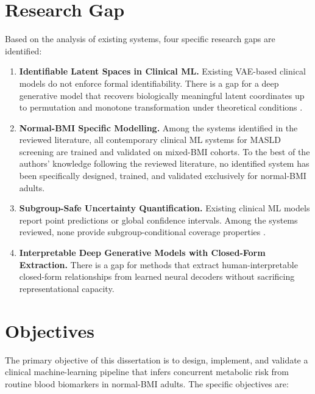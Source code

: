 \documentclass[12pt,a4paper,oneside]{report}
\begin{document}
\section{Research Gap}

Based on the analysis of existing systems, four specific research gaps are identified:

\begin{enumerate}[leftmargin=*]
    \item \textbf{Identifiable Latent Spaces in Clinical ML.} Existing VAE-based clinical models do not enforce formal identifiability. There is a gap for a deep generative model that recovers biologically meaningful latent coordinates up to permutation and monotone transformation under theoretical conditions \citep{khemakhem2020,kingma2014}.

    \item \textbf{Normal-BMI Specific Modelling.} Among the systems identified in the reviewed literature, all contemporary clinical ML systems for MASLD screening are trained and validated on mixed-BMI cohorts. To the best of the authors' knowledge following the reviewed literature, no identified system has been specifically designed, trained, and validated exclusively for normal-BMI adults.

    \item \textbf{Subgroup-Safe Uncertainty Quantification.} Existing clinical ML models report point predictions or global confidence intervals. Among the systems reviewed, none provide subgroup-conditional coverage properties \citep{barber2023,vovk2005}.

    \item \textbf{Interpretable Deep Generative Models with Closed-Form Extraction.} There is a gap for methods that extract human-interpretable closed-form relationships from learned neural decoders without sacrificing representational capacity.
\end{enumerate}

\section{Objectives}

The primary objective of this dissertation is to design, implement, and validate a clinical machine-learning pipeline that infers concurrent metabolic risk from routine blood biomarkers in normal-BMI adults. The specific objectives are:
\end{document}
